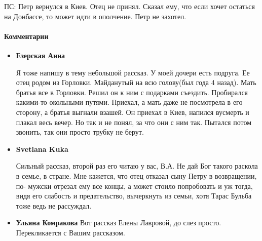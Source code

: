 ПС: Петр вернулся в Киев. Отец не принял. Сказал ему, что если хочет остаться
на Донбассе, то может идти в ополчение. Петр не захотел.
\restorecr

\paragraph{Комментарии}

\begin{itemize}
\item \textbf{Езерская Анна}

Я тоже напишу в тему небольшой рассказ. У моей дочери есть подруга. Ее отец
родом из Горловки. Майданутый на всю голову(был года 4 назад). Мать братья все
в Горловки. Решил он к ним с подарками съездить. Пробирался какими-то окольными
путями. Приехал, а мать даже не посмотрела в его сторону, а братья выгнали
взашей. Он приехал в Киев, напился вусмерть и плакал весь вечер. Но так и не
понял, за что они с ним так. Пытался потом звонить, так они просто трубку не
берут.

\item \textbf{Svetlana Kuka}

Сильный рассказ, второй раз его читаю у вас, В.А. Не дай Бог такого раскола в
семье, в стране. Мне кажется, что отец отказал сыну Петру в возвращении, по-
мужски отрезал ему все концы, а может стоило попробовать и уж тогда, видя его
слабость и предательство, вычеркнуть из семьи, хотя Тарас Бульба тоже ведь не
рассуждал.

\item \textbf{Ульяна Комракова}
Вот рассказ Елены Лавровой, до слез просто. Перекликается с Вашим рассказом.

\end{itemize}

